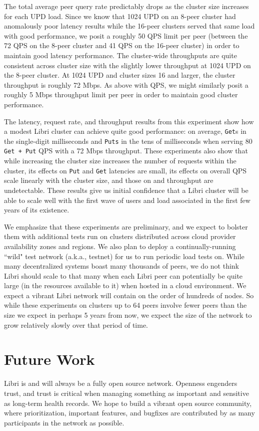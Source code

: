 \documentclass[10pt]{article}
\newcommand{\ttt}[1]{\texttt{#1}}
\begin{document}
The total average peer query rate predictably drops as the cluster size increases for each UPD load. Since we know that 1024 UPD on an 8-peer cluster had anomalously poor latency results while the 16-peer clusters served that same load with good performance, we posit a roughly 50 QPS limit per peer (between the 72 QPS on the 8-peer cluster and 41 QPS on the 16-peer cluster) in order to maintain good latency performance. The cluster-wide throughputs are quite consistent across cluster size with the slightly lower throughput at 1024 UPD on the 8-peer cluster. At 1024 UPD and cluster sizes 16 and larger, the cluster throughput is roughly 72 Mbps. As above with QPS, we might similarly posit a roughly 5 Mbps throughput limit per peer in order to maintain good cluster performance.

The latency, request rate, and throughput results from this experiment show how a modest Libri cluster can achieve quite good performance: on average, \ttt{Get}s in the single-digit milliseconds and \texttt{Puts} in the tens of milliseconds when serving 80 \texttt{Get + Put} QPS with a 72 Mbps throughput. These experiments also show that while increasing the cluster size increases the number of requests within the cluster, its effects on \texttt{Put} and \texttt{Get} latencies are small, its effects on overall QPS scale linearly with the cluster size, and those on and throughput are undetectable. These results give us initial confidence that a Libri cluster will be able to scale well with the first wave of users and load associated in the first few years of its existence.

We emphasize that these experiments are preliminary, and we expect to bolster them with additional tests run on clusters distributed across cloud provider availability zones and regions. We also plan to deploy a continually-running ``wild" test network (a.k.a., testnet) for us to run periodic load tests on. While many decentralized systems boast many thousands of peers, we do not think Libri should scale to that many when each Libri peer can potentially be quite large (in the resources available to it) when hosted in a cloud environment. We expect a vibrant Libri network will contain on the order of hundreds of nodes. So while these experiments on clusters up to 64 peers involve fewer peers than the size we expect in perhaps 5 years from now, we expect the size of the network to grow relatively slowly over that period of time.


\section{Future Work}
\label{sec:future}
Libri is and will always be a fully open source network. Openness engenders trust, and trust is critical when managing something as important and sensitive as long-term health records. We hope to build a vibrant open source community, where prioritization, important features, and bugfixes are contributed by as many participants in the network as possible. 
\end{document}
